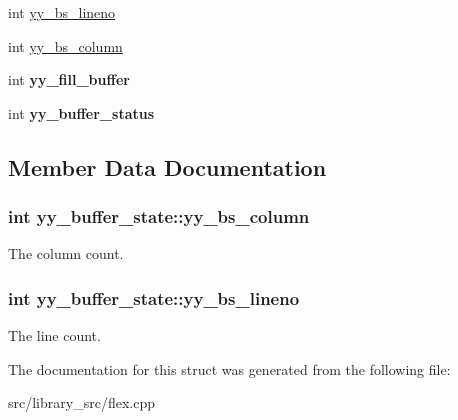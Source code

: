 \begin{DoxyCompactItemize}
\item 
int \hyperlink{structyy__buffer__state_a818e94bc9c766e683c60df1e9fd01199}{yy\+\_\+bs\+\_\+lineno}
\item 
int \hyperlink{structyy__buffer__state_a10c4fcd8be759e6bf11e6d3e8cdb0307}{yy\+\_\+bs\+\_\+column}
\item 
int {\bfseries yy\+\_\+fill\+\_\+buffer}\hypertarget{structyy__buffer__state_a63d2afbb1d79a3fc63df9e12626f827d}{}\label{structyy__buffer__state_a63d2afbb1d79a3fc63df9e12626f827d}

\item 
int {\bfseries yy\+\_\+buffer\+\_\+status}\hypertarget{structyy__buffer__state_a70fd925d37a2f0454fbd0def675d106c}{}\label{structyy__buffer__state_a70fd925d37a2f0454fbd0def675d106c}

\end{DoxyCompactItemize}


\subsection{Member Data Documentation}
\subsubsection[{\texorpdfstring{yy\+\_\+bs\+\_\+column}{yy_bs_column}}]{\setlength{\rightskip}{0pt plus 5cm}int yy\+\_\+buffer\+\_\+state\+::yy\+\_\+bs\+\_\+column}\hypertarget{structyy__buffer__state_a10c4fcd8be759e6bf11e6d3e8cdb0307}{}\label{structyy__buffer__state_a10c4fcd8be759e6bf11e6d3e8cdb0307}
The column count. 
\subsubsection[{\texorpdfstring{yy\+\_\+bs\+\_\+lineno}{yy_bs_lineno}}]{\setlength{\rightskip}{0pt plus 5cm}int yy\+\_\+buffer\+\_\+state\+::yy\+\_\+bs\+\_\+lineno}\hypertarget{structyy__buffer__state_a818e94bc9c766e683c60df1e9fd01199}{}\label{structyy__buffer__state_a818e94bc9c766e683c60df1e9fd01199}
The line count. 

The documentation for this struct was generated from the following file\+:\begin{DoxyCompactItemize}
\item 
src/library\+\_\+src/flex.\+cpp\end{DoxyCompactItemize}

